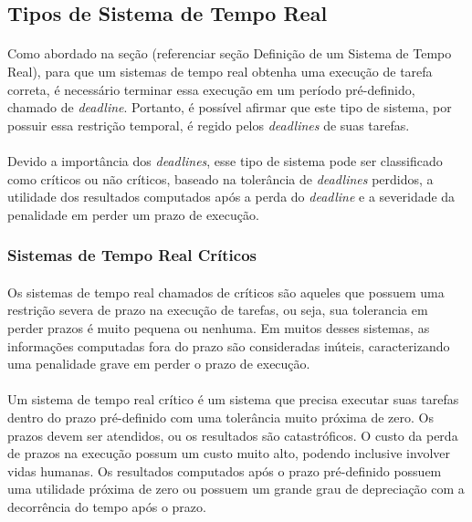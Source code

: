 \subsection{Tipos de Sistema de Tempo Real}
\paragraph{}
Como abordado na seção (referenciar seção Definição de um Sistema de Tempo Real),
para que um sistemas de tempo real obtenha uma execução de tarefa correta,
é necessário terminar essa execução em um período pré-definido, chamado de \textit{deadline}.
Portanto, é possível afirmar que este tipo de sistema, por possuir essa restrição temporal,
é regido pelos \textit{deadlines} de suas tarefas.
\paragraph{}
Devido a importância dos \textit{deadlines}, esse tipo de sistema pode ser classificado como
críticos ou não críticos, baseado na tolerância de \textit{deadlines} perdidos, a utilidade
dos resultados computados após a perda do \textit{deadline} e a severidade da penalidade em
perder um prazo de execução.

\subsubsection{Sistemas de Tempo Real Críticos}
\paragraph{}
Os sistemas de tempo real chamados de críticos são aqueles que possuem uma restrição severa
de prazo na execução de tarefas, ou seja, sua tolerancia em perder prazos é muito pequena
ou nenhuma. Em muitos desses sistemas, as informações computadas fora do prazo são consideradas
inúteis, caracterizando uma penalidade grave em perder o prazo de execução.
\paragraph{}
Um sistema de tempo real crítico é um sistema que precisa executar suas tarefas dentro do prazo
pré-definido com uma tolerância muito próxima de zero. Os prazos devem ser atendidos, ou os resultados
são catastróficos. O custo da perda de prazos na execução possum um custo muito alto, podendo inclusive
involver vidas humanas. Os resultados computados após o prazo pré-definido possuem uma utilidade próxima
de zero ou possuem um grande grau de depreciação com a decorrência do tempo após o prazo.~\cite{Li:2003:RCE:829584}
